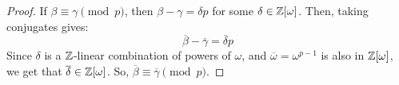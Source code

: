 \begin{proof}
    If $\beta \equiv \gamma \pmod{p}$, then $\beta - \gamma = \delta p$ for some $\delta \in \mathbb{Z}[\omega]$. Then, taking conjugates gives:
    \[ \overline{\beta} - \overline{\gamma} = \overline{\delta}p \]
    Since $\delta$ is a $\mathbb{Z}$-linear combination of powers of $\omega$, and $\overline{\omega} = \omega^{p-1}$ is also in $\mathbb{Z}[\omega]$, we get that $\overline{\delta} \in \mathbb{Z}[\omega]$. So, $\overline{\beta} \equiv \overline{\gamma} \pmod{p}$.
\end{proof}